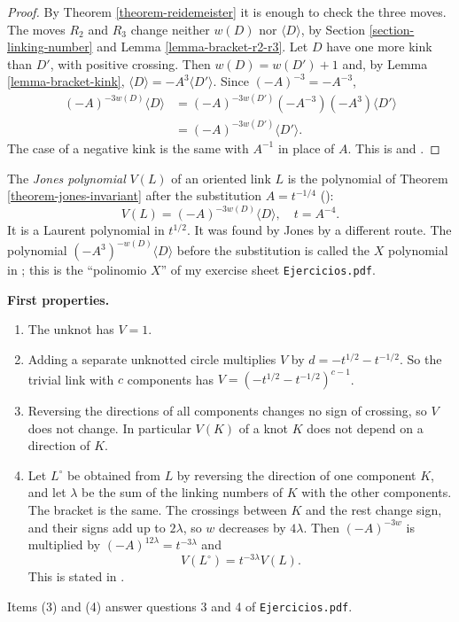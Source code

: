 \begin{proof}
By Theorem \ref{theorem-reidemeister}
it is enough to check the three moves.
The moves $R_2$ and $R_3$ change neither
$w(D)$ nor $\langle D\rangle$, by
Section \ref{section-linking-number}
and Lemma \ref{lemma-bracket-r2-r3}.
Let $D$ have one more kink than $D'$,
with positive crossing. Then
$w(D)=w(D')+1$ and, by
Lemma \ref{lemma-bracket-kink},
$\langle D\rangle
=-A^{3}\langle D'\rangle$.
Since $(-A)^{-3}=-A^{-3}$,
$$
\begin{aligned}
(-A)^{-3w(D)}\langle D\rangle
&=(-A)^{-3w(D')}(-A^{-3})(-A^{3})
\langle D'\rangle\\
&=(-A)^{-3w(D')}\langle D'\rangle.
\end{aligned}
$$
The case of a negative kink is the
same with $A^{-1}$ in place of $A$.
This is \cite[Theorem 3.5]{lickorish}
and \cite[Theorem 11.4.2]{murasugi}.
\end{proof}

\noindent
The {\it Jones polynomial} $V(L)$ of an
oriented link $L$ is the polynomial of
Theorem \ref{theorem-jones-invariant}
after the substitution
$A=t^{-1/4}$
(\cite[Definition 3.6]{lickorish}):
\begin{equation}
\label{equation-jones-definition}
V(L)=
(-A)^{-3w(D)}\langle D\rangle,
\quad
t=A^{-4}.
\end{equation}
It is a Laurent polynomial in
$t^{1/2}$. It was found by Jones
\cite{jones-polynomial} by a different
route. The polynomial
$(-A^{3})^{-w(D)}\langle D\rangle$
before the substitution is called the
$X$ polynomial in
\cite[Section 6.1]{adams-knot-book};
this is the ``polinomio $X$'' of my
exercise sheet {\tt Ejercicios.pdf}.

\medskip\noindent
{\bf First properties.}
\begin{enumerate}
\item The unknot has $V=1$.
\item Adding a separate unknotted
circle multiplies $V$ by
$d=-t^{1/2}-t^{-1/2}$. So the trivial
link with $c$ components has
$V=(-t^{1/2}-t^{-1/2})^{c-1}$.
\item Reversing the directions of all
components changes no sign of crossing,
so $V$ does not change. In particular
$V(K)$ of a knot $K$ does not depend on
a direction of $K$.
\item Let $L^{\circ}$ be obtained from
$L$ by reversing the direction of one
component $K$, and let $\lambda$ be the
sum of the linking numbers of $K$ with
the other components. The bracket is
the same. The crossings between $K$
and the rest change sign, and their
signs add up to $2\lambda$, so
$w$ decreases by $4\lambda$. Then
$(-A)^{-3w}$ is multiplied by
$(-A)^{12\lambda}=t^{-3\lambda}$ and
$$
V(L^{\circ})=t^{-3\lambda}V(L).
$$
This is stated in
\cite[p.\ 26]{lickorish}.
\end{enumerate}
Items (3) and (4) answer questions 3
and 4 of {\tt Ejercicios.pdf}.

